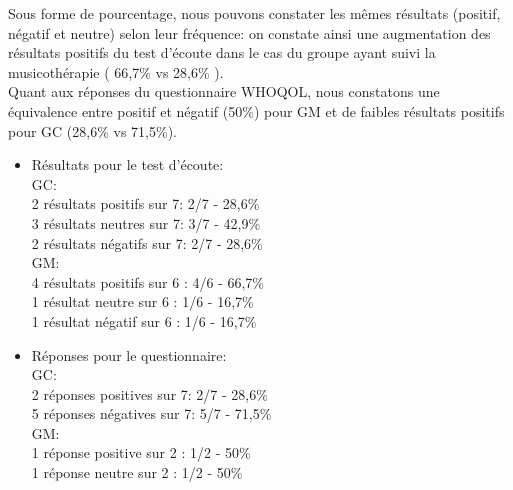   
  Sous forme de pourcentage, nous pouvons constater les mêmes résultats (positif, négatif et neutre) 
 selon leur fréquence: on constate ainsi une augmentation des résultats positifs du test d'écoute dans le 
 cas du groupe ayant suivi la musicothérapie ( 66,7\% vs 28,6\% ). 
 	 \\ 
 Quant aux réponses du questionnaire WHOQOL, nous constatons une équivalence entre positif et 
 négatif (50\%) pour GM et de faibles résultats positifs pour GC (28,6\% vs 71,5\%).
    
   \begin{itemize}
   	 \item Résultats pour le test d'écoute:
   	 \\ 
 GC: 
  \\
2 résultats positifs sur 7:       2/7 - 28,6\%
\\
3 résultats neutres sur 7:			3/7 - 42,9\%
 \\
 2 résultats négatifs sur 7:		2/7 - 28,6\%
 \\
GM:
  \\
 4 résultats positifs sur 6    :       4/6 - 66,7\%
  \\
  1 résultat neutre sur 6 : 			1/6 - 16,7\%
 \\  
  1 résultat négatif sur 6 : 		     1/6 - 16,7\%
 \\
  		    \item Réponses pour le questionnaire:    
 \\
 GC: 
 \\
 2 réponses positives sur 7:       2/7  - 28,6\%
 \\
 5 réponses négatives sur 7: 	5/7 - 71,5\%
 \\
 GM:
  \\
 1 réponse positive sur 2    :       1/2 - 50\%
   \\
   1 réponse neutre sur 2 : 			1/2 - 50\%
  		  \end{itemize}
  	  
  	  


